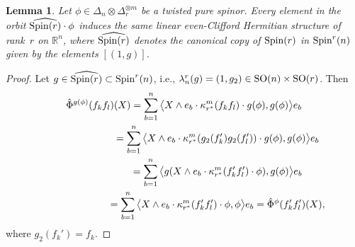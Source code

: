 \documentclass[pdftex]{sigma}
\numberwithin{equation}{section}
\newtheorem{Lemma}[Theorem]{Lemma}
\begin{document}
\begin{Lemma}\label{lemma: Spin(r) orbit pure spinor}Let $\phi\in\Delta_n\otimes\Delta_r^{\otimes m}$ be a twisted pure spinor. Every element in the orbit $\widehat{{\rm Spin}(r)}\cdot \phi$ induces the same linear even-Clifford Hermitian structure of rank~$r$ on $\mathbb{R}^n$, where $\widehat{{\rm Spin}(r)}$ denotes the canonical copy of ${\rm Spin}(r)$ in ${\rm Spin}^r(n)$ given by the elements $[(1,g)]$.
\end{Lemma}
\begin{proof} Let $g\in \widehat{{\rm Spin}(r)}\subset {\rm Spin}^r(n)$, i.e., $\lambda_n^r(g) = (1,g_2)\in {\rm SO}(n)\times {\rm SO}(r)$. Then
\begin{gather*}
\hat\Phi^{g(\phi)}(f_kf_l)(X) = \sum_{b=1}^n \big\langle X\wedge e_b\cdot \kappa_{r^*}^m(f_kf_l)\cdot g(\phi),g(\phi)\big\rangle e_b \\
\hphantom{\hat\Phi^{g(\phi)}(f_kf_l)(X)}{} =
 \sum_{b=1}^n\big\langle X\wedge e_b\cdot \kappa_{r^*}^m(g_2(f_k')g_2(f_l'))\cdot g(\phi),g(\phi)\big\rangle e_b\\
\hphantom{\hat\Phi^{g(\phi)}(f_kf_l)(X)}{} =
 \sum_{b=1}^n\big\langle g(X\wedge e_b\cdot \kappa_{r^*}^m(f_k'f_l')\cdot \phi),g(\phi)\big\rangle e_b\\
\hphantom{\hat\Phi^{g(\phi)}(f_kf_l)(X)}{} =
 \sum_{b=1}^n\big\langle X\wedge e_b\cdot \kappa_{r^*}^m(f_k'f_l')\cdot \phi,\phi\big\rangle e_b =
\hat\Phi^\phi(f_k'f_l')(X),
\end{gather*}
where $g_2(f_k')=f_k$.
\end{proof}
\end{document}

